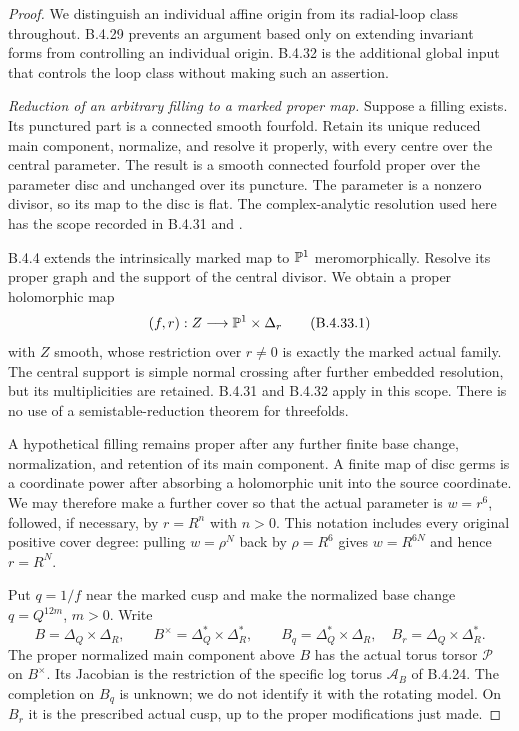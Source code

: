 \begin{proof}
We distinguish an individual affine origin from its
radial-loop class throughout. B.4.29 prevents an
argument based only on extending invariant forms
from controlling an individual origin. B.4.32 is
the additional global input that controls the loop
class without making such an assertion.

\emph{Reduction of an arbitrary filling to a marked proper map.}
Suppose a filling exists. Its punctured part is a
connected smooth fourfold. Retain its unique reduced
main component, normalize, and resolve it properly,
with every centre over the central parameter. The
result is a smooth connected fourfold proper over
the parameter disc and unchanged over its puncture.
The parameter is a nonzero divisor, so its map to
the disc is flat. The complex-analytic resolution
used here has the scope recorded in B.4.31 and
\citet[Theorems 1.6 and 1.10]{BM95AB}.

B.4.4 extends the intrinsically marked map to
$\mathbb P^1$ meromorphically. Resolve its proper graph
and the support of the central divisor. We obtain
a proper holomorphic map
\[
 (f,r):Z\longrightarrow\mathbb P^1\times\Delta_r
 \tag{B.4.33.1}
\]
with $Z$ smooth, whose restriction over $r\ne0$
is exactly the marked actual family. The central
support is simple normal crossing after further
embedded resolution, but its multiplicities are
retained. B.4.31 and B.4.32 apply in this scope.
There is no use of a semistable-reduction theorem
for threefolds.

A hypothetical filling remains proper after any
further finite base change, normalization, and
retention of its main component. A finite map of
disc germs is a coordinate power after absorbing
a holomorphic unit into the source coordinate.
We may therefore make a further cover so that
the actual parameter is $w=r^6$, followed, if
necessary, by $r=R^n$ with $n>0$. This notation
includes every original positive cover degree:
pulling $w=\rho^N$ back by $\rho=R^6$ gives
$w=R^{6N}$ and hence $r=R^N$.

Put $q=1/f$ near the marked cusp and make the
normalized base change $q=Q^{12m}$, $m>0$.
Write
\[
 B=\Delta_Q\times\Delta_R,\qquad
 B^\times=\Delta_Q^*\times\Delta_R^*,\qquad
 B_q=\Delta_Q^*\times\Delta_R,\quad
 B_r=\Delta_Q\times\Delta_R^*.
 \tag{B.4.33.2}
\]
The proper normalized main component above $B$
has the actual torus torsor $\mathscr P$ on
$B^\times$. Its Jacobian is the restriction of
the specific log torus $\mathcal A_B$ of
B.4.24. The completion on $B_q$ is unknown;
we do not identify it with the rotating model.
On $B_r$ it is the prescribed actual cusp,
up to the proper modifications just made.


\end{proof}
